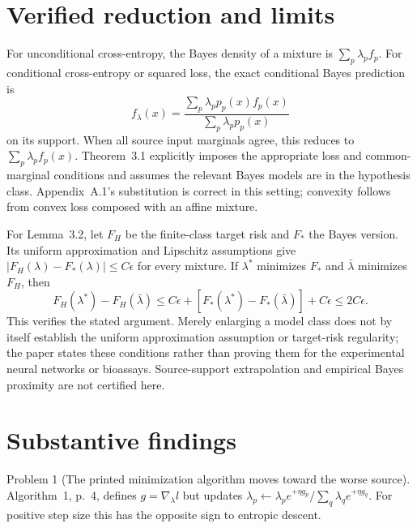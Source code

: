 \documentclass[10pt]{article}
\begin{document}
\section*{Verified reduction and limits}
For unconditional cross-entropy, the Bayes density of a mixture is \(\sum_p\lambda_p f_p\). For conditional cross-entropy or squared loss, the exact conditional Bayes prediction is \[f_\lambda(x)=
 \frac{\sum_p\lambda_p p_p(x) f_p(x)}
      {\sum_p\lambda_p p_p(x)}\] on its support. When all source input marginals agree, this reduces to \(\sum_p\lambda_p f_p(x)\). Theorem 3.1 explicitly imposes the appropriate loss and common-marginal conditions and assumes the relevant Bayes models are in the hypothesis class. Appendix A.1’s substitution is correct in this setting; convexity follows from convex loss composed with an affine mixture.\par
For Lemma 3.2, let \(F_H\) be the finite-class target risk and \(F_*\) the Bayes version. Its uniform approximation and Lipschitz assumptions give \(|F_H(\lambda)-F_*(\lambda)|\le C\epsilon\) for every mixture. If \(\lambda^*\) minimizes \(F_*\) and \(\bar\lambda\) minimizes \(F_H\), then \[F_H(\lambda^*)-F_H(\bar\lambda)
 \le C\epsilon+[F_*(\lambda^*)-F_*(\bar\lambda)]+C\epsilon
 \le 2C\epsilon.\] This verifies the stated argument. Merely enlarging a model class does not by itself establish the uniform approximation assumption or target-risk regularity; the paper states these conditions rather than proving them for the experimental neural networks or bioassays. Source-support extrapolation and empirical Bayes proximity are not certified here.\par
\section*{Substantive findings}
Problem 1 (The printed minimization algorithm moves toward the worse source).  Algorithm 1, p. 4, defines \(g=\nabla_\lambda l\) but updates \(\lambda_p\leftarrow\lambda_p e^{+\eta g_p}/\sum_q\lambda_q e^{+\eta g_q}\). For positive step size this has the opposite sign to entropic descent.\par
\end{document}
